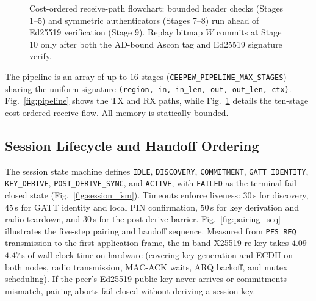 \documentclass[conference]{IEEEtran}
\begin{document}
\begin{figure}[t]
{%
}
\caption{Cost-ordered receive-path flowchart: bounded header checks (Stages 1--5) and symmetric authenticators (Stages 7--8) run ahead of Ed25519 verification (Stage 9). Replay bitmap $W$ commits at Stage 10 only after both the AD-bound Ascon tag and Ed25519 signature verify.}
\label{fig:receive_path}
\end{figure}

The pipeline is an array of up to $16$ stages (\texttt{CEEPEW\_PIPELINE\_MAX\_STAGES}) sharing the uniform signature \texttt{(region, in, in\_len, out, out\_len, ctx)}. Fig.~\ref{fig:pipeline} shows the TX and RX paths, while Fig.~\ref{fig:receive_path} details the ten-stage cost-ordered receive flow. All memory is statically bounded.

\subsection{Session Lifecycle and Handoff Ordering}
The session state machine defines \texttt{IDLE}, \texttt{DISCOVERY}, \texttt{COMMITMENT}, \texttt{GATT\_IDENTITY}, \texttt{KEY\_DERIVE}, \texttt{POST\_DERIVE\_SYNC}, and \texttt{ACTIVE}, with \texttt{FAILED} as the terminal fail-closed state (Fig.~\ref{fig:session_fsm}). Timeouts enforce liveness: $30$\,s for discovery, $45$\,s for GATT identity and local PIN confirmation, $50$\,s for key derivation and radio teardown, and $30$\,s for the post-derive barrier. Fig.~\ref{fig:pairing_seq} illustrates the five-step pairing and handoff sequence. Measured from \texttt{PFS\_REQ} transmission to the first application frame, the in-band X25519 re-key takes $4.09$--$4.47$\,s of wall-clock time on hardware (covering key generation and ECDH on both nodes, radio transmission, MAC-ACK waits, ARQ backoff, and mutex scheduling). If the peer's Ed25519 public key never arrives or commitments mismatch, pairing aborts fail-closed without deriving a session key.
\end{document}

